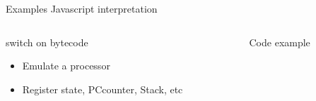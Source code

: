 %
\begin{Frame}{Examples Javascript interpretation}
  \begin{columns}[t]
    \begin{column}{5cm} %
      \begin{block}{switch on bytecode}
        \begin{itemize}
        \item Emulate a processor
        \item Register state, PCcounter, Stack, etc

        \end{itemize}
      \end{block} 
    \end{column}
    
    \begin{column}{5cm} %
      \begin{block}{Code example}\tiny
        
      \end{block}   
    \end{column}
  \end{columns}  
\end{Frame}


